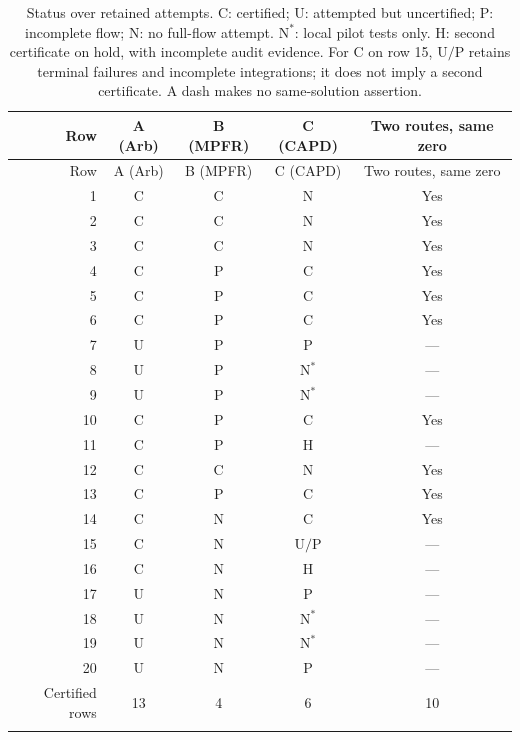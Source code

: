\documentclass[10pt,a4paper]{article}
\theoremstyle{remark}
\newcommand{\Cert}{\mathrm{C}}
\newcommand{\Uncert}{\mathrm{U}}
\newcommand{\Partial}{\mathrm{P}}
\newcommand{\Notrun}{\mathrm{N}}
\newcommand{\Hold}{\mathrm{H}}
\begin{document}
\begingroup
\small
\setlength{\LTcapwidth}{\textwidth}
\setlength{\LTpre}{4pt}
\begin{longtable}{@{}rcccc@{}}
\toprule
Row & A (Arb) & B (MPFR) & C (CAPD) & Two routes, same zero\\
\midrule
\endfirsthead
\toprule
Row & A (Arb) & B (MPFR) & C (CAPD) & Two routes, same zero\\
\midrule
\endhead
1 & $\Cert$ & $\Cert$ & $\Notrun$ & Yes\\
2 & $\Cert$ & $\Cert$ & $\Notrun$ & Yes\\
3 & $\Cert$ & $\Cert$ & $\Notrun$ & Yes\\
4 & $\Cert$ & $\Partial$ & $\Cert$ & Yes\\
5 & $\Cert$ & $\Partial$ & $\Cert$ & Yes\\
6 & $\Cert$ & $\Partial$ & $\Cert$ & Yes\\
7 & $\Uncert$ & $\Partial$ & $\Partial$ & ---\\
8 & $\Uncert$ & $\Partial$ & $\Notrun^{*}$ & ---\\
9 & $\Uncert$ & $\Partial$ & $\Notrun^{*}$ & ---\\
10 & $\Cert$ & $\Partial$ & $\Cert$ & Yes\\
11 & $\Cert$ & $\Partial$ & $\Hold$ & ---\\
12 & $\Cert$ & $\Cert$ & $\Notrun$ & Yes\\
13 & $\Cert$ & $\Partial$ & $\Cert$ & Yes\\
14 & $\Cert$ & $\Notrun$ & $\Cert$ & Yes\\
15 & $\Cert$ & $\Notrun$ & $\Uncert/\Partial$ & ---\\
16 & $\Cert$ & $\Notrun$ & $\Hold$ & ---\\
17 & $\Uncert$ & $\Notrun$ & $\Partial$ & ---\\
18 & $\Uncert$ & $\Notrun$ & $\Notrun^{*}$ & ---\\
19 & $\Uncert$ & $\Notrun$ & $\Notrun^{*}$ & ---\\
20 & $\Uncert$ & $\Notrun$ & $\Partial$ & ---\\
\midrule
Certified rows & 13 & 4 & 6 & 10\\
\bottomrule
\caption{Status over retained attempts. $\Cert$: certified;
$\Uncert$: attempted but uncertified; $\Partial$: incomplete flow;
$\Notrun$: no full-flow attempt. $\Notrun^{*}$: local pilot tests only.
$\Hold$: second certificate on hold, with incomplete audit evidence.
For C on row 15, $\Uncert/\Partial$ retains terminal failures and
incomplete integrations; it does not imply a second certificate. A dash makes no
same-solution assertion.}
\label{tab:rows}
\end{longtable}
\end{document}
